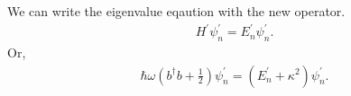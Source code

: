 \documentclass[floatfix,nofootinbib,superscriptaddress,fleqn]{revtex4-2}
\begin{document}
\begin{itemize}
    We can write the eigenvalue eqaution with the new operator.
    \begin{align}
      H^\prime \psi^\prime_n = E^\prime_n\psi^\prime_n.
    \end{align}
    Or,
    \begin{align}
      \hbar\omega\left(b^\dagger b
    + \frac{1}{2}\right)\psi^\prime_n = \left(E^\prime_n+\kappa^2\right)\psi^\prime_n.
    \end{align}

\end{itemize}
\end{document}
